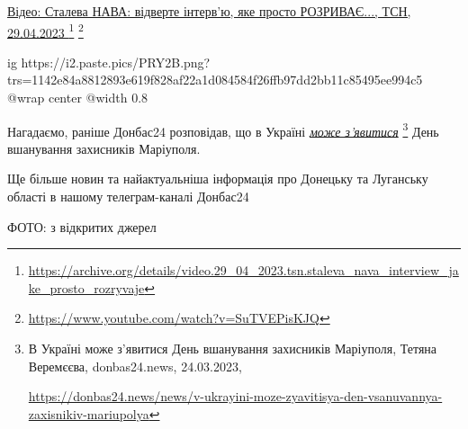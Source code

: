 \href{https://archive.org/details/video.29_04_2023.tsn.staleva_nava_interview_jake_prosto_rozryvaje}{%
Відео: Сталева НАВА: відверте інтерв'ю, яке просто РОЗРИВАЄ..., ТСН, 29.04.2023%
}%
\footnote{\url{https://archive.org/details/video.29_04_2023.tsn.staleva_nava_interview_jake_prosto_rozryvaje}} %
\footnote{\url{https://www.youtube.com/watch?v=SuTVEPisKJQ}}

\ifcmt
  ig https://i2.paste.pics/PRY2B.png?trs=1142e84a8812893e619f828af22a1d084584f26ffb97dd2bb11c85495ee994c5
  @wrap center
  @width 0.8
\fi

Нагадаємо, раніше Донбас24 розповідав, що в Україні \href{https://donbas24.news/news/v-ukrayini-moze-zyavitisya-den-vsanuvannya-zaxisnikiv-mariupolya}{\emph{може з'явитися}}%
\footnote{В Україні може з’явитися День вшанування захисників Маріуполя, Тетяна Веремєєва, donbas24.news, 24.03.2023, \par\url{https://donbas24.news/news/v-ukrayini-moze-zyavitisya-den-vsanuvannya-zaxisnikiv-mariupolya}}
День вшанування захисників Маріуполя.

Ще більше новин та найактуальніша інформація про Донецьку та Луганську області
в нашому телеграм-каналі Донбас24

ФОТО: з відкритих джерел

